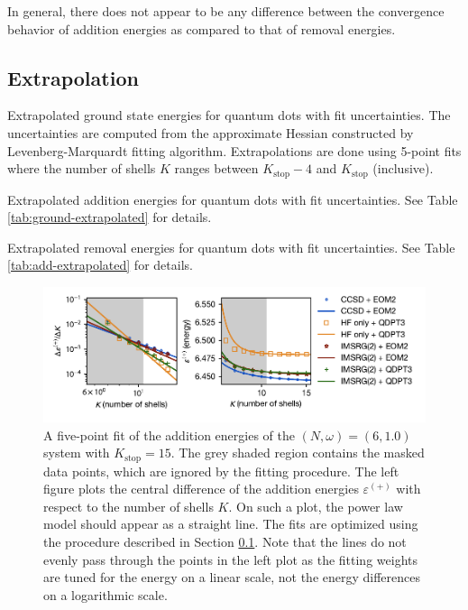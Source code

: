 In general, there does not appear to be any difference between the convergence behavior of addition energies as compared to that of removal energies.

\subsection{Extrapolation}
\label{subsec:extrapolation}

\begin{table}
  \centering
  \caption{Extrapolated ground state energies for quantum dots with fit uncertainties.  The uncertainties are computed from the approximate Hessian constructed by Levenberg-Marquardt fitting algorithm.  Extrapolations are done using 5-point fits where the number of shells $K$ ranges between $K_{\text{stop}} - 4$ and $K_{\text{stop}}$ (inclusive).}
  \label{tab:ground-extrapolated}
  
\end{table}

\begin{table}
  \centering
  \caption{Extrapolated addition energies for quantum dots with fit uncertainties.  See Table \ref{tab:ground-extrapolated} for details.}
  \label{tab:add-extrapolated}
  
\end{table}

\begin{table}
  \centering
  \caption{Extrapolated removal energies for quantum dots with fit uncertainties.  See Table \ref{tab:add-extrapolated} for details.}
  \label{tab:rm-extrapolated}
  
\end{table}

\begin{figure}
  \centering
  \includegraphics{fig-fit-2-1p0-add.pdf}
  \caption{A five-point fit of the addition energies of the $(N, \omega) = (6, 1.0)$ system with $K_{\text{stop}} = 15$.  The grey shaded region contains the masked data points, which are ignored by the fitting procedure.  The left figure plots the central difference of the addition energies $\varepsilon^{(+)}$ with respect to the number of shells $K$.  On such a plot, the power law model should appear as a straight line.  The fits are optimized using the procedure described in Section \ref{subsec:extrapolation}.  Note that the lines do not evenly pass through the points in the left plot as the fitting weights are tuned for the energy on a linear scale, not the energy differences on a logarithmic scale.}
  \label{fig:by-fit-2-1p0-add}
\end{figure}

